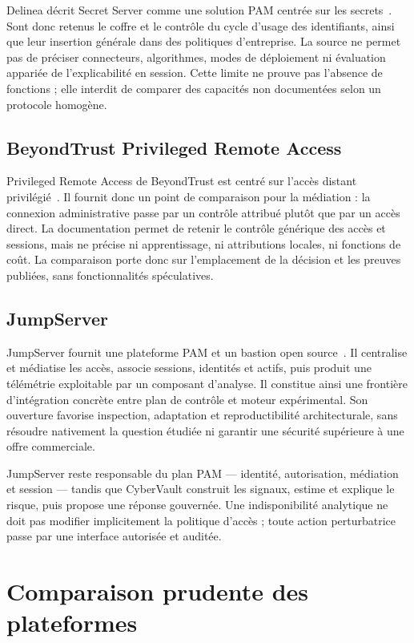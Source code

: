 \documentclass[11pt,a4paper,oneside]{report}
\theoremstyle{definition}
\theoremstyle{plain}
\begin{document}
Delinea décrit Secret Server comme une solution PAM centrée sur les secrets~\cite{ref18}. Sont donc retenus le coffre et le contrôle du cycle d'usage des identifiants, ainsi que leur insertion générale dans des politiques d'entreprise. La source ne permet pas de préciser connecteurs, algorithmes, modes de déploiement ni évaluation appariée de l'explicabilité en session. Cette limite ne prouve pas l'absence de fonctions ; elle interdit de comparer des capacités non documentées selon un protocole homogène.

\subsection{BeyondTrust Privileged Remote Access}

Privileged Remote Access de BeyondTrust est centré sur l'accès distant privilégié~\cite{ref17}. Il fournit donc un point de comparaison pour la médiation : la connexion administrative passe par un contrôle attribué plutôt que par un accès direct. La documentation permet de retenir le contrôle générique des accès et sessions, mais ne précise ni apprentissage, ni attributions locales, ni fonctions de coût. La comparaison porte donc sur l'emplacement de la décision et les preuves publiées, sans fonctionnalités spéculatives.

\subsection{JumpServer}

JumpServer fournit une plateforme PAM et un bastion open source~\cite{ref5}. Il centralise et médiatise les accès, associe sessions, identités et actifs, puis produit une télémétrie exploitable par un composant d'analyse. Il constitue ainsi une frontière d'intégration concrète entre plan de contrôle et moteur expérimental. Son ouverture favorise inspection, adaptation et reproductibilité architecturale, sans résoudre nativement la question étudiée ni garantir une sécurité supérieure à une offre commerciale.

JumpServer reste responsable du plan PAM --- identité, autorisation, médiation et session --- tandis que CyberVault construit les signaux, estime et explique le risque, puis propose une réponse gouvernée. Une indisponibilité analytique ne doit pas modifier implicitement la politique d'accès ; toute action perturbatrice passe par une interface autorisée et auditée.

\section{Comparaison prudente des plateformes}
\end{document}
